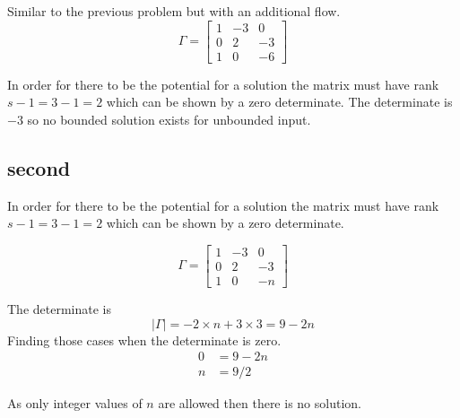 \documentclass{article}
\begin{document}
Similar to the previous problem but with an additional flow.
\begin{equation}
\Gamma =
\begin{bmatrix}
1 & -3 & 0 \\
0 & 2 & -3 \\
1 & 0 & -6
\end{bmatrix}
\end{equation}

In order for there to be the potential for a solution the
matrix must have rank $s - 1 = 3 - 1 = 2$ which can
be shown by a zero determinate. The determinate is $-3$
so no bounded solution exists for unbounded input.



\subsection{second}



In order for there to be the potential for a solution the
matrix must have rank $s - 1 = 3 - 1 = 2$ which can
be shown by a zero determinate.

\begin{equation}
\Gamma =
\begin{bmatrix}
1 & -3 & 0 \\
0 & 2 & -3 \\
1 & 0 & -n
\end{bmatrix}
\end{equation}

The determinate is
\begin{equation}
| \Gamma | = - 2 \times n + 3 \times 3 = 9 - 2 n
\end{equation}
Finding those cases when the determinate is zero.
\begin{align}
0 & = 9 - 2 n \\
n & = 9 / 2
\end{align}

As only integer values of $n$ are allowed then there is no solution.
\end{document}

